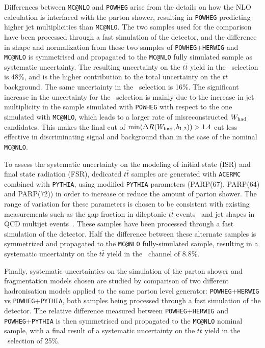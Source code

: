 Differences between \texttt{MC@NLO} and \texttt{POWHEG} arise from 
the details on how the NLO calculation is interfaced with the parton 
shower, resulting in \texttt{POWHEG} predicting higher
jet multiplicities than \texttt{MC@NLO}. The two samples used for the
comparison have been processed through a fast simulation of the detector,
and the difference in shape and normalization from these two samples of
\texttt{POWHEG}+\texttt{HERWIG} 
and \texttt{MC@NLO} is symmetrised and propagated to the 
\texttt{MC@NLO} fully simulated sample as systematic uncertainty. 
The resulting uncertainty on the $t\bar{t}$ yield in the \tight\ selection 
is 48\%, and is the higher contribution to the total uncertainty
on the $t\bar{t}$ background. The same uncertainty in the \loose\ selection 
is 16\%. The significant
increase in the uncertainty for the \tight\ selection 
is mainly due to the increase in jet multiplicity in the
sample simulated with \texttt{POWHEG} with respect to the
one simulated with \texttt{MC@NLO}, 
which leads to a larger rate of misreconstructed $W_{\rm had}$ 
candidates. This makes the final cut of 
$\min(\Delta R(W_{\rm had}, b_{1,2}))>1.4$ cut less 
effective in discriminating signal and background than in the 
case of the nominal \texttt{MC@NLO}.

To assess the systematic uncertainty on the modeling of 
initial state (ISR) and final state radiation (FSR), dedicated
$t\bar{t}$ samples are generated with \texttt{ACERMC}
combined with \texttt{PYTHIA}, using modified \texttt{PYTHIA} parameters 
(PARP(67), PARP(64) and PARP(72)) 
in order to increase or reduce the amount of parton shower. 
The range of variation for these parameters is chosen to be 
consistent with existing measurements such as the gap fraction in dileptonic 
$t\bar{t}$ events~\cite{ttjet} and jet shapes in QCD multijet events~\cite{morelessPS}.  
These samples have been processed through a fast simulation
of the detector. Half the difference between these alternate samples is symmetrized 
and propagated to the \texttt{MC@NLO} fully-simulated sample, resulting in a
systematic uncertainty on the $t\bar{t}$ yield in the \tight\ channel of 8.8\%.

Finally, systematic uncertainties on the simulation 
of the parton shower and fragmentation models chosen 
are studied by comparison of two different hadronisation 
models applied to the same parton level generator: 
\texttt{POWHEG}+\texttt{HERWIG} vs \texttt{POWHEG}+\texttt{PYTHIA}, 
both samples being processed through a fast simulation of the detector.
The relative difference measured between 
\texttt{POWHEG}+\texttt{HERWIG} and \texttt{POWHEG}+\texttt{PYTHIA} is 
then symmetrised and propagated to the 
\texttt{MC@NLO} nominal sample, with a final
result of a systematic uncertainty on the 
$t\bar{t}$ yield in the \tight\ selection of 25\%. 


